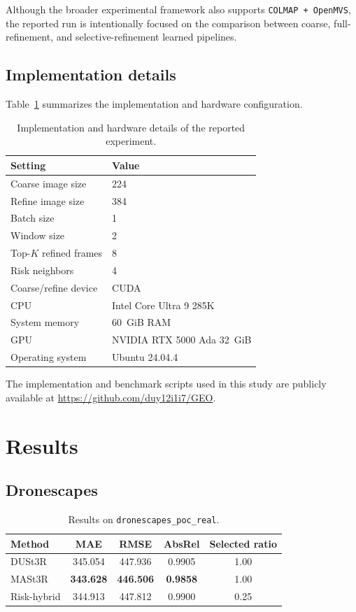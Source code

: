 \documentclass[preprint,12pt]{elsarticle}
\begin{document}
Although the broader experimental framework also supports \texttt{COLMAP + OpenMVS}, the reported run is intentionally focused on the comparison between coarse, full-refinement, and selective-refinement learned pipelines.

\subsection{Implementation details}

Table~\ref{tab:implementation-details} summarizes the implementation and hardware configuration.

\begin{table}[t]
\centering
\small
\begin{tabular}{lp{8.2cm}}
\toprule
Setting & Value \\
\midrule
Coarse image size & 224 \\
Refine image size & 384 \\
Batch size & 1 \\
Window size & 2 \\
Top-$K$ refined frames & 8 \\
Risk neighbors & 4 \\
Coarse/refine device & CUDA \\
CPU & Intel Core Ultra 9 285K \\
System memory & 60~GiB RAM \\
GPU & NVIDIA RTX 5000 Ada 32~GiB \\
Operating system & Ubuntu 24.04.4 \\
\bottomrule
\end{tabular}
\caption{Implementation and hardware details of the reported experiment.}
\label{tab:implementation-details}
\end{table}

The implementation and benchmark scripts used in this study are publicly available at \url{https://github.com/duy12i1i7/GEO}.

\section{Results}

\subsection{Dronescapes}

\begin{table}[t]
\centering
\small
\begin{tabular}{lcccc}
\toprule
Method & MAE & RMSE & AbsRel & Selected ratio \\
\midrule
DUSt3R & 345.054 & 447.936 & 0.9905 & 1.00 \\
MASt3R & \textbf{343.628} & \textbf{446.506} & \textbf{0.9858} & 1.00 \\
Risk-hybrid & 344.913 & 447.812 & 0.9900 & 0.25 \\
\bottomrule
\end{tabular}
\caption{Results on \texttt{dronescapes\_poc\_real}.}
\label{tab:dronescapes-isprs}
\end{table}
\end{document}
